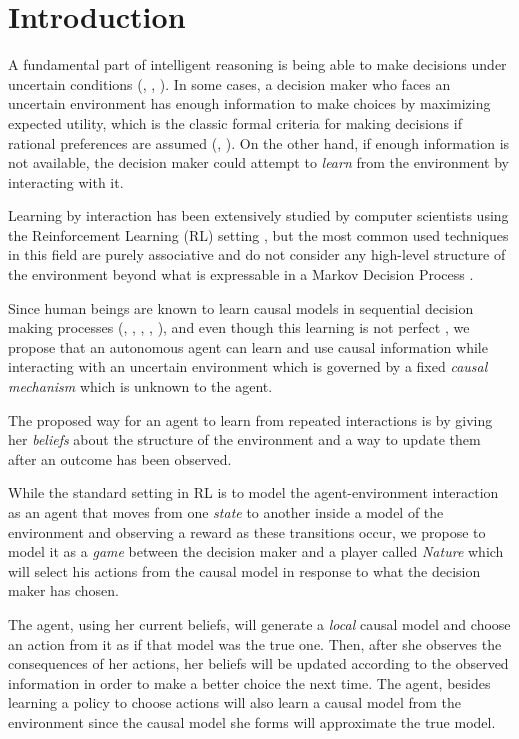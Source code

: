 \documentclass{article}
\begin{document}
\section{Introduction}
A fundamental part of intelligent reasoning is being able to make decisions under uncertain conditions (\cite{danks2014unifying}, \cite{lake2017building}, \cite{pearlwhy}). In some cases, a decision maker who faces an uncertain environment has enough information to make choices by maximizing expected utility, which is the classic formal criteria for making decisions if rational preferences are assumed (\cite{bernardo2000bayesian}, \cite{gilboa2009decision}). On the other hand, if enough information is not available, the decision maker could attempt to \textit{learn} from the environment by interacting with it.

Learning by interaction has been extensively studied by computer scientists using the Reinforcement Learning (RL) setting \cite{sutton1998reinforcement}, but the most common used techniques  in this field are purely associative and do not consider any high-level structure of the environment beyond what is expressable in a Markov Decision Process \cite{garnelo2016towards}.

Since human beings are known to learn causal models in sequential decision making processes (\cite{sloman2006causal}, \cite{nichols2007decision}, \cite{meder2010observing}, \cite{hagmayer2013repeated}, \cite{danks2014unifying}), and even though this learning is not perfect \cite{rottman2014reasoning}, we propose that an autonomous agent can learn and use causal information while interacting with an uncertain environment which is governed by a fixed \textit{causal mechanism} which is unknown to the agent.  

The proposed way for an agent to learn from repeated interactions is by giving her \textit{beliefs} about the structure of the environment and a way to update them after an outcome has been observed.

While the standard setting in RL is to model the agent-environment interaction as an agent that moves from one \textit{state} to another inside a model of the environment and observing a reward as these transitions occur, we propose to model it as a \textit{game} between the decision maker and a player called \textit{Nature} which will select his actions from the causal model in response to what the decision maker has chosen. 

The agent, using her current beliefs, will generate a \textit{local} causal model and choose an action from it as if that model was the true one. Then, after she observes the consequences of her actions, her beliefs will be updated according to the observed information in order to make a better choice the next time. The agent, besides learning a policy to choose actions will also learn a causal model from the environment since the causal model she forms will approximate the true model.
\end{document}
